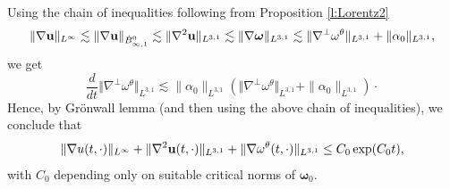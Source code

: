 \documentclass[11pt]{amsart}
\numberwithin{equation}{section}
\newcommand{\nrm}[1]{\Vert#1\Vert}
\newcommand{\nb}{\nabla}
\newcommand{\alp}{\alpha}
\newcommand{\tht}{\theta}
\newcommand{\omg}{\omega}
\newcommand{\bfu}{{\bf u}}
\newcommand{\bfomg}{{\boldsymbol{\omega}}}
\begin{document}
Using the chain of inequalities following from Proposition \ref{l:Lorentz2} 
$$ \nrm{ \nb \bfu}_{L^\infty}\lesssim  \|\nb \bfu\|_{\dot B^0_{\infty,1}} \lesssim \|\nb^2 \bfu\|_{L^{3,1}}  \lesssim \nrm{\nb\bfomg}_{L^{3,1}} \lesssim \|\nb^\perp\omg^\tht\|_{L^{3,1}} + \|\alp_0 \|_{L^{3,1}},$$ we get 
\begin{equation*}
		\frac{d}{dt} \nrm{ \nb^\perp \omg^\tht  }_{L^{3,1}} \lesssim \|\alp_0 \|_{L^{3,1}} \left( \nrm{ \nb^\perp  \omg^\tht }_{L^{3,1}} + \|\alp_0 \|_{L^{3,1}}\right)\cdotp
\end{equation*}
Hence, by Gr\"onwall  lemma (and then using the above chain of inequalities), we conclude that
 \begin{equation}\label{eq:nablau}
		\nrm{ \nb u(t,\cdot)}_{L^\infty} + \nrm{ \nb^2 \bfu(t,\cdot)}_{L^{3,1}}  +  \nrm{\nb\omg^{\tht}(t,\cdot)}_{L^{3,1}} \le C_0 \exp(C_0t),
		\end{equation} 
 with $C_0$ depending only on suitable critical norms of $\bfomg_0.$ 
	
\end{document}

